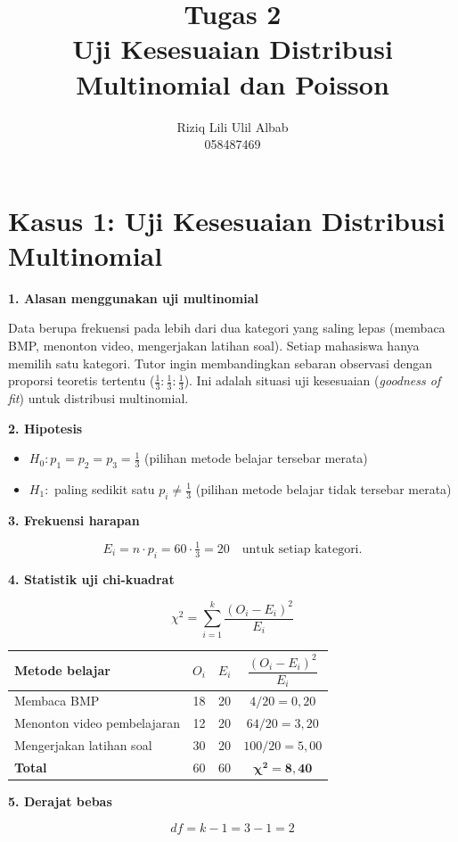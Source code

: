 \documentclass[11pt,a4paper]{article}
\title{\textbf{Tugas 2}\\[4pt]\large Uji Kesesuaian Distribusi Multinomial dan Poisson}
\author{
 Riziq Lili Ulil Albab \\ 
 058487469 \\
}
\newcommand{\soal}[1]{\par\Needspace{6\baselineskip}\medskip\textbf{#1}\par}
\newcommand{\chisq}{\chi^2}
\begin{document}
\maketitle
\vspace{-2.5em}

\section{Kasus 1: Uji Kesesuaian Distribusi Multinomial}

\soal{1. Alasan menggunakan uji multinomial}
Data berupa frekuensi pada lebih dari dua kategori yang saling lepas (membaca BMP, menonton video, mengerjakan latihan soal). Setiap mahasiswa hanya memilih satu kategori. Tutor ingin membandingkan sebaran observasi dengan proporsi teoretis tertentu ($\tfrac13 : \tfrac13 : \tfrac13$). Ini adalah situasi uji kesesuaian (\emph{goodness of fit}) untuk distribusi multinomial.

\soal{2. Hipotesis}
\begin{itemize}
  \item $H_0: p_1 = p_2 = p_3 = \tfrac13$ \quad (pilihan metode belajar tersebar merata)
  \item $H_1:$ paling sedikit satu $p_i \neq \tfrac13$ \quad (pilihan metode belajar tidak tersebar merata)
\end{itemize}

\soal{3. Frekuensi harapan}
\[
E_i = n \cdot p_i = 60 \cdot \tfrac13 = 20 \quad \text{untuk setiap kategori.}
\]

\soal{4. Statistik uji chi-kuadrat}
\[
\chisq = \sum_{i=1}^{k} \frac{(O_i - E_i)^2}{E_i}
\]
\begin{center}
\begin{tabular}{lccc}
\toprule
Metode belajar & $O_i$ & $E_i$ & $\dfrac{(O_i-E_i)^2}{E_i}$ \\
\midrule
Membaca BMP & 18 & 20 & $4/20 = 0{,}20$ \\
Menonton video pembelajaran & 12 & 20 & $64/20 = 3{,}20$ \\
Mengerjakan latihan soal & 30 & 20 & $100/20 = 5{,}00$ \\
\midrule
\textbf{Total} & 60 & 60 & $\boldsymbol{\chisq = 8{,}40}$ \\
\bottomrule
\end{tabular}
\end{center}

\soal{5. Derajat bebas}
\[
df = k - 1 = 3 - 1 = 2
\]
\end{document}
